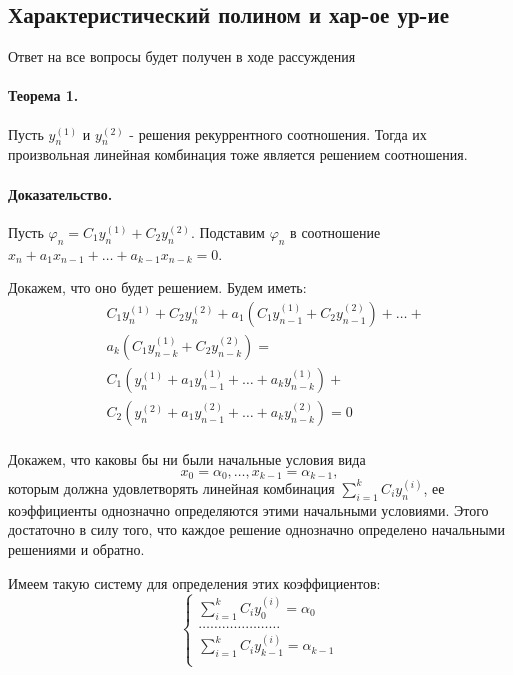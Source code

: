 \documentclass{report}
\begin{document}
\subsection{Характеристический полином и хар-ое ур-ие}
Ответ на все вопросы будет получен в ходе рассуждения

\medskip

\paragraph*{Теорема 1.}
Пусть $y_{n}^{(1)}$ и $y_{n}^{(2)}$ - решения рекуррентного соотношения. Тогда их
произвольная линейная комбинация тоже является решением соотношения.

\paragraph*{Доказательство.}
Пусть $\varphi_{n} = C_1y^{(1)}_{n} + C_2y^{(2)}_{n}$. Подставим
$\varphi_{n}$ в соотношение $x_{n} + a_1x_{n-1} + \ldots + a_{k-1}x_{n-k} = 0$.

Докажем, что оно будет решением. Будем иметь:
\begin{align*}
&C_1y^{(1)}_{n} + C_2y^{(2)}_{n} + a_1(C_1y^{(1)}_{n-1} + C_2y^{(2)}_{n-1}) + \ldots + \\
&a_{k}(C_1y^{(1)}_{n-k} + C_2y^{(2)}_{n-k}) = \\
&C_1(y^{(1)}_{n} + a_1y^{(1)}_{n-1} + \ldots + a_{k}y^{(1)}_{n - k}) + \\
&C_2(y^{(2)}_{n} + a_1y^{(2)}_{n-1} + \ldots + a_{k}y^{(2)}_{n - k}) = 0 \\
\end{align*}

Докажем, что каковы бы ни были начальные условия вида
\[
x_0=\alpha_0, \ldots, x_{k-1}=\alpha_{k-1},
\] 
которым должна удовлетворять
линейная комбинация $\sum\limits_{i=1}^{k}C_{i}y^{(i)}_{n} $, ее коэффициенты
однозначно определяются этими начальными условиями. Этого достаточно в силу
того, что каждое решение однозначно определено начальными решениями и обратно.

Имеем такую систему для определения этих коэффициентов:
\[
\begin{cases}
	\sum\limits_{i=1}^{k}C_{i}y^{(i)}_{0} = \alpha_0\\ 
	\ldots\ldots\ldots\ldots\ldots\ldots\ldots\\
	\sum\limits_{i=1}^{k}C_{i}y^{(i)}_{k-1} = \alpha_{k-1}\\ 
\end{cases}
\] 
\end{document}
